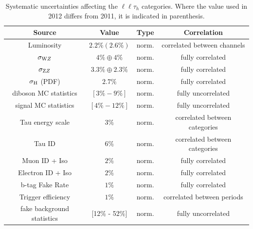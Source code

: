 \begin{table}
  \begin{center}
    \caption{Systematic uncertainties affecting the $\ell\ell\tau_h$ categories.  Where the value used in 2012 differs from 2011, it is indicated in parenthesis.}
    \label{tab:systematics}
    \begin{tabular}{c c c c}
      \hline
      Source                  & Value & Type & Correlation\\
      \hline
      Luminosity              & $2.2\% (2.6\%)$ & norm. & correlated between channels \\
      $\sigma_{\rm WZ}$        & $4\% \oplus 4\%$  & norm. & fully correlated\\
      $\sigma_{\rm ZZ}$        & $3.3\% \oplus 2.3\%$   & norm. & fully correlated\\
      $\sigma_{\rm H}$ (PDF)   & $2.7\%$  & norm. & fully correlated \\
      diboson MC statistics & $[3\% - 9\%]$ & norm. & fully uncorrelated \\
      signal MC statistics & $[4\% - 12\%]$ & norm. & fully uncorrelated \\
      Tau energy scale        & $3\%$   & norm. & correlated between categories\\
      Tau ID                  & $6\%$ & norm. & correlated between categories\\
      Muon ID + Iso           & $2\%$ & norm. & fully correlated \\
      Electron ID + Iso       & $2\%$ & norm. & fully correlated  \\
      b-tag Fake Rate         & $1\%$ & norm. & fully correlated  \\
      Trigger efficiency  & $1\%$ & norm. & correlated between periods  \\
      fake background statistics & [12\% - 52\%] & norm. & fully uncorrelated \\

\end{tabular}
\end{center}
\end{table}
